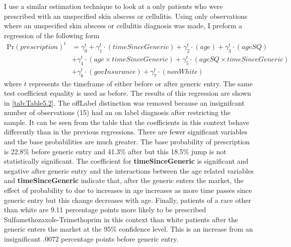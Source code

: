 \newpage
I use a similar estimation technique to look at a only patients who were prescribed with an unspecified skin abscess or cellulitis. Using only observations where an unspecified skin abscess or cellulitis diagnosis was made, I preform a regression of the following form
\begin{equation}
\begin{split}
    \text{Pr}(prescription)^t & = \gamma^t_0 + \gamma^t_1\cdot(timeSinceGeneric)+ \gamma_2^t\cdot(age) + \gamma_3^t\cdot(ageSQ)\\
    &  + \gamma_4^t\cdot(age\times timeSinceGeneric)+ \gamma_5^t\cdot(ageSQ\times timeSinceGeneric)\\
    & + \gamma_6^t\cdot(govInsurance) + \gamma_7^t\cdot(nonWhite)
\end{split}
\end{equation}
where $t$ represents the timeframe of either before or after generic entry. The same test coefficient equality is used as before. The results of this regression are shown in \autoref{tab:Table5.2}. The offLabel distinction was removed because an insignifcant number of observations (15) had an on label diagnosis after restricting the sample.
\indent It can be seen from the table that the coefficients in this context behave differently than in the previous regressions. There are fewer significant variables and the base probabilities are much greater. The base probability of prescription is 22.8\% before generic entry and 41.3\% after but this 18.5\% jump is not statistically significant. The coefficient for \textbf{timeSinceGeneric} is significant and negative after generic entry and the interactions between the age related variables and \textbf{timeSinceGeneric} indicate that, after the generic enters the market, the effect of probability to due to increases in age increases as more time passes since generic entry but this change decreases with age. Finally, patients of a race other than white are 9.11 percentage points more likely to be prescribed Sulfamethozaxole-Trimethoprim in this context than white patients after the generic enters the market at the 95\% confidence level. This is an increase from an insignificant .0072 percentage points before generic entry.
 
